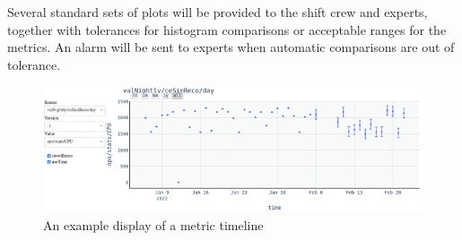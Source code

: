 Several standard sets of plots will be provided to the shift crew and experts, together with tolerances for histogram comparisons or acceptable ranges for the metrics. An alarm will be sent to experts when automatic comparisons are out of tolerance.

\begin{figure}[htb]
\begin{center}
\includegraphics[width=0.9\linewidth]{figures/dqm_timeline.png}
\caption{An example display of a metric timeline}
\label{fig:timeline}
\end{center}
\end{figure}
